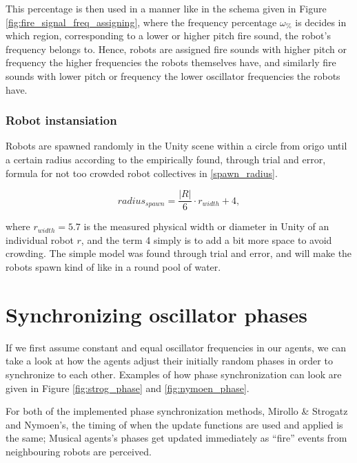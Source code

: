 			This percentage is then used in a manner like in the schema given in Figure \ref{fig:fire_signal_freq_assigning}, where the frequency percentage $\omega_\%$ is decides in which region, corresponding to a lower or higher pitch fire sound, the robot's frequency belongs to. Hence, robots are assigned fire sounds with higher pitch or frequency the higher frequencies the robots themselves have, and similarly fire sounds with lower pitch or frequency the lower oscillator frequencies the robots have.

		\subsubsection{Robot instansiation}
		
		Robots are spawned randomly in the Unity scene within a circle from origo until a certain radius according to the empirically found, through trial and error, formula for not too crowded robot collectives in \eqref{spawn_radius}.
		
		\begin{equation}\label{spawn_radius}
			radius_{spawn} = \frac{|R|}{6} \cdot r_{width} + 4,
		\end{equation}
		
		where $r_{width} = 5.7$ is the measured physical width or diameter in Unity of an individual robot $r$, and the term 4 simply is to add a bit more space to avoid crowding. The simple model was found through trial and error, and will make the robots spawn kind of like in a round pool of water.




\section{Synchronizing oscillator phases}
\label{sec:phase_methods}
	If we first assume constant and equal oscillator frequencies in our agents, we can take a look at how the agents adjust their initially random phases in order to synchronize to each other. Examples of how phase synchronization can look are given in Figure \ref{fig:strog_phase} and \ref{fig:nymoen_phase}.
	
	For both of the implemented phase synchronization methods, Mirollo \& Strogatz and Nymoen's, the timing of when the update functions are used and applied is the same; Musical agents's phases get updated immediately as ``fire'' events from neighbouring robots are perceived.
	
